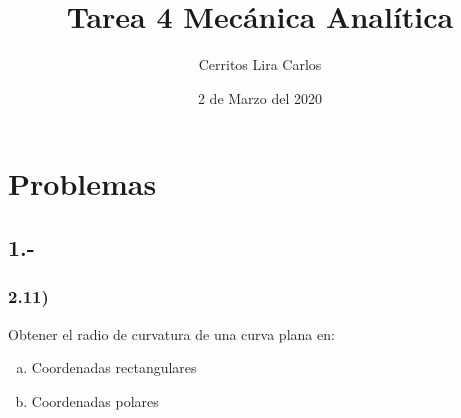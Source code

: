 \documentclass{article}
\title{Tarea 4 Mecánica Analítica}
\author{Cerritos Lira Carlos}
\date{2 de Marzo del 2020}
\begin{document}
\maketitle
\section*{Problemas}
\subsection*{1.-}
\subsubsection*{2.11)}
Obtener el radio de curvatura de una curva plana en:
\begin{enumerate}[a)]
    \item Coordenadas rectangulares
    \item Coordenadas polares
\end{enumerate}
\end{document}
